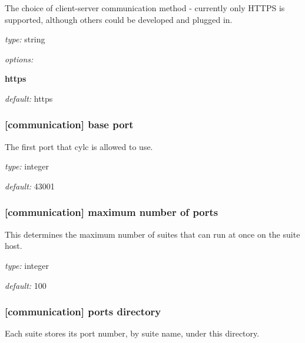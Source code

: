 The choice of client-server communication method - currently only HTTPS
is supported, although others could be developed and plugged in.

\begin{myitemize}
\item {\em type:} string
\item {\em options:}
    \begin{myitemize}
    \item {\bf https}
    \end{myitemize}
\item {\em default:} https
\end{myitemize}

\subsubsection[base port]{[communication] \textrightarrow base port }

The first port that cylc is allowed to use.

\begin{myitemize}
\item {\em type:} integer
\item {\em default:} 43001
\end{myitemize}

\subsubsection[maximum number of ports]{[communication] \textrightarrow maximum number of ports}

This determines the maximum number of suites that can run at once on the
suite host.

\begin{myitemize}
\item {\em type:} integer
\item {\em default:} 100
\end{myitemize}

\subsubsection[ports directory]{[communication] \textrightarrow ports directory}

Each suite stores its port number, by suite name, under this directory.


